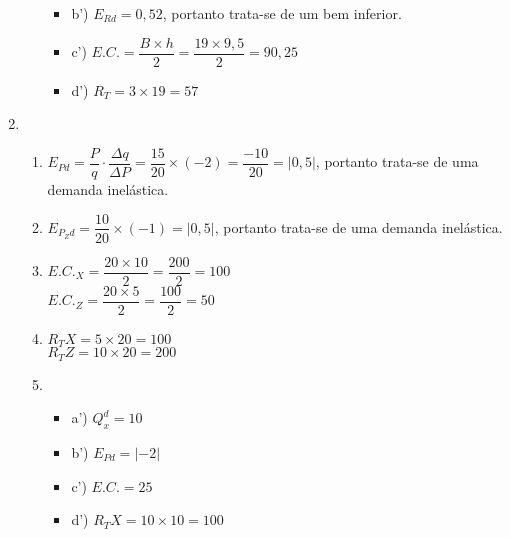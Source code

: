 \documentclass[a4paper, 12pt]{article}
\begin{document}
\begin{enumerate}
\begin{enumerate}
\begin{itemize}
			\item b') $E_{Rd}=0,52$, portanto trata-se de um bem inferior.\\
			
			\item c') $E.C.= \dfrac{B\times h}{2}= \dfrac{19\times 9,5}{2}=90,25$\\
			
			\item d') $R_T=3\times 19=57$\\
		\end{itemize}
	\end{enumerate}
	
	\item %
	\begin{enumerate}
		\item $E_{Pd}= \dfrac{P}{q}\cdot \dfrac{\Delta q}{\Delta P}= \dfrac{15}{20}\times(-2)= \dfrac{-10}{20}=|0,5|$, portanto trata-se de uma demanda inelástica.\\
		
		\item $E_{P_Zd}=\dfrac{10}{20}\times (-1)=|0,5|$, portanto trata-se de uma demanda inelástica.\\

		\item $E.C._X=\dfrac{20\times 10}{2}=\dfrac{200}{2}=100$\\
			$E.C._Z=\dfrac{20\times 5}{2}=\dfrac{100}{2}=50$\\
		
		\item $R_TX=5\times 20=100$\\
			$R_TZ=10\times 20=200$\\

		\item
			\begin{itemize}
				\item a') $Q_x^d=10$\\

				\item b') $E_{Pd}=|-2|$\\

				\item c') $E.C.=25$\\

				\item d') $R_TX=10\times 10=100$\\
			\end{itemize}
	\end{enumerate}
	

\end{enumerate}
\end{document}
